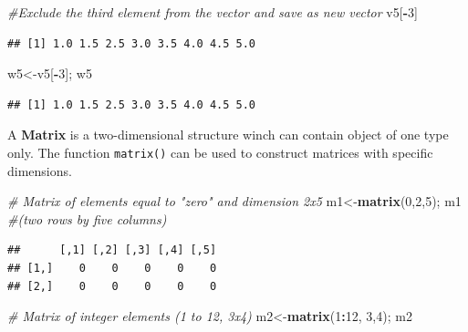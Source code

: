 \documentclass[
]{article}
\newenvironment{Shaded}{\begin{snugshade}}{\end{snugshade}}
\newcommand{\CommentTok}[1]{\textcolor[rgb]{0.56,0.35,0.01}{\textit{#1}}}
\newcommand{\DecValTok}[1]{\textcolor[rgb]{0.00,0.00,0.81}{#1}}
\newcommand{\FunctionTok}[1]{\textcolor[rgb]{0.13,0.29,0.53}{\textbf{#1}}}
\newcommand{\NormalTok}[1]{#1}
\newcommand{\OtherTok}[1]{\textcolor[rgb]{0.56,0.35,0.01}{#1}}
\newcommand{\SpecialCharTok}[1]{\textcolor[rgb]{0.81,0.36,0.00}{\textbf{#1}}}
\begin{document}
\begin{Shaded}
\begin{Highlighting}[]
\CommentTok{\#Exclude the third element from the vector and save as new vector}
\NormalTok{v5[}\SpecialCharTok{{-}}\DecValTok{3}\NormalTok{]}
\end{Highlighting}
\end{Shaded}

\begin{verbatim}
## [1] 1.0 1.5 2.5 3.0 3.5 4.0 4.5 5.0
\end{verbatim}

\begin{Shaded}
\begin{Highlighting}[]
\NormalTok{w5}\OtherTok{\textless{}{-}}\NormalTok{v5[}\SpecialCharTok{{-}}\DecValTok{3}\NormalTok{]; w5}
\end{Highlighting}
\end{Shaded}

\begin{verbatim}
## [1] 1.0 1.5 2.5 3.0 3.5 4.0 4.5 5.0
\end{verbatim}

A \textbf{Matrix} is a two-dimensional structure winch can contain object of one type only.
The function \texttt{matrix()} can be used to construct matrices with specific dimensions.

\begin{Shaded}
\begin{Highlighting}[]
\CommentTok{\# Matrix of elements equal to "zero" and dimension 2x5 }
\NormalTok{m1}\OtherTok{\textless{}{-}}\FunctionTok{matrix}\NormalTok{(}\DecValTok{0}\NormalTok{,}\DecValTok{2}\NormalTok{,}\DecValTok{5}\NormalTok{); m1  }\CommentTok{\#(two rows by five columns)}
\end{Highlighting}
\end{Shaded}

\begin{verbatim}
##      [,1] [,2] [,3] [,4] [,5]
## [1,]    0    0    0    0    0
## [2,]    0    0    0    0    0
\end{verbatim}

\begin{Shaded}
\begin{Highlighting}[]
\CommentTok{\# Matrix of integer elements (1 to 12, 3x4) }
\NormalTok{m2}\OtherTok{\textless{}{-}}\FunctionTok{matrix}\NormalTok{(}\DecValTok{1}\SpecialCharTok{:}\DecValTok{12}\NormalTok{, }\DecValTok{3}\NormalTok{,}\DecValTok{4}\NormalTok{); m2 }
\end{Highlighting}
\end{Shaded}
\end{document}
